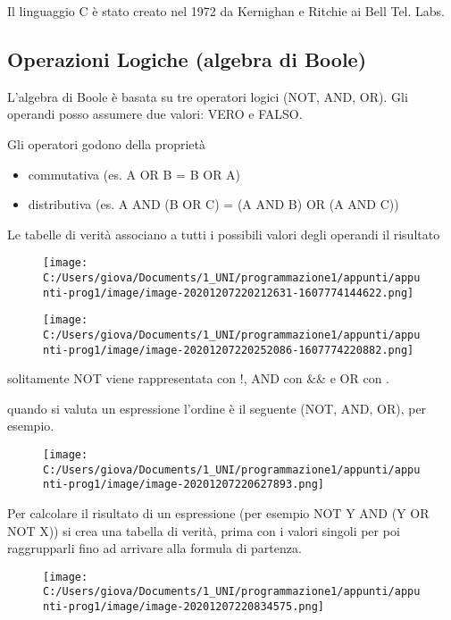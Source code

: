 \documentclass[
]{article}
\begin{document}
Il linguaggio C è stato creato nel 1972 da Kernighan e Ritchie ai Bell
Tel. Labs.

\hypertarget{header-n339}{%
\subsection{Operazioni Logiche (algebra di Boole)}\label{header-n339}}

L'algebra di Boole è basata su tre operatori logici (NOT, AND, OR). Gli
operandi posso assumere due valori: VERO e FALSO.

Gli operatori godono della proprietà

\begin{itemize}
\item
  commutativa (es. A OR B = B OR A)
\item
  distributiva (es. A AND (B OR C) = (A AND B) OR (A AND C))
\end{itemize}

Le tabelle di verità associano a tutti i possibili valori degli operandi
il risultato

\begin{figure}
\centering
\texttt{[image: C:/Users/giova/Documents/1\_UNI/programmazione1/appunti/appunti-prog1/image/image-20201207220212631-1607774144622.png]}
\caption{}
\end{figure}

\begin{figure}
\centering
\texttt{[image: C:/Users/giova/Documents/1\_UNI/programmazione1/appunti/appunti-prog1/image/image-20201207220252086-1607774220882.png]}
\caption{}
\end{figure}

solitamente NOT viene rappresentata con !, AND con \&\& e OR con
\textbar\textbar.

quando si valuta un espressione l'ordine è il seguente (NOT, AND, OR),
per esempio.

\begin{figure}
\centering
\texttt{[image: C:/Users/giova/Documents/1\_UNI/programmazione1/appunti/appunti-prog1/image/image-20201207220627893.png]}
\caption{}
\end{figure}

Per calcolare il risultato di un espressione (per esempio NOT Y AND (Y
OR NOT X)) si crea una tabella di verità, prima con i valori singoli per
poi raggrupparli fino ad arrivare alla formula di partenza.

\begin{figure}
\centering
\texttt{[image: C:/Users/giova/Documents/1\_UNI/programmazione1/appunti/appunti-prog1/image/image-20201207220834575.png]}
\caption{}
\end{figure}
\end{document}
